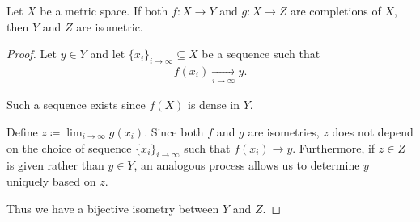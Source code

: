 \begin{proposition}\label{thm:metric_space_completion_uniqueness}
  Let $X$ be a metric space. If both $f: X \to Y$ and $g: X \to Z$ are completions of $X$, then $Y$ and $Z$ are isometric.
\end{proposition}
\begin{proof}
  Let $y \in Y$ and let $\{ x_i \}_{i \to \infty} \subseteq X$ be a sequence such that
  \begin{align*}
    f(x_i) \xrightarrow[i \to \infty]{} y.
  \end{align*}

  Such a sequence exists since $f(X)$ is dense in $Y$.

  Define $z \coloneqq \lim_{i \to \infty} g(x_i)$. Since both $f$ and $g$ are isometries, $z$ does not depend on the choice of sequence $\{ x_i \}_{i \to \infty}$ such that $f(x_i) \to y$. Furthermore, if $z \in Z$ is given rather than $y \in Y$, an analogous process allows us to determine $y$ uniquely based on $z$.

  Thus we have a bijective isometry between $Y$ and $Z$.
\end{proof}
